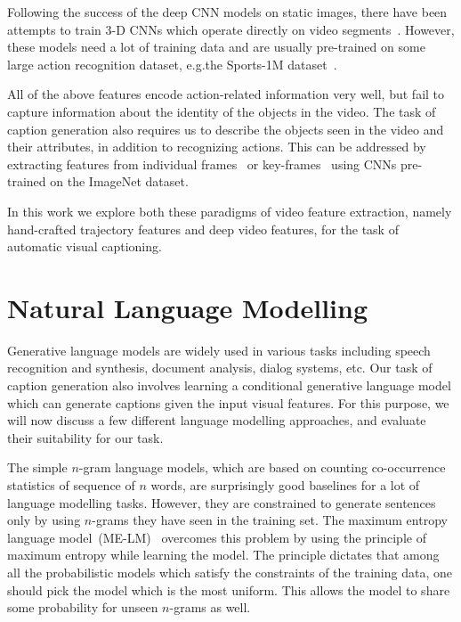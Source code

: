 Following the success of the deep CNN models on static images, there have been
attempts to train 3-D CNNs which operate directly on video
segments~\cite{3dCNN_ji2013, KarpathyCVPR14, DBLP:C3D}.
However, these models need a lot of training data and are usually pre-trained on
some large action recognition dataset, e.g.\@ the Sports-1M
dataset~\cite{KarpathyCVPR14}.

All of the above features encode action-related information very well, but fail to
capture information about the identity of the objects in the video.
The task of caption generation also requires us to describe the objects seen in
the video and their attributes, in addition to recognizing actions.
This can be addressed by extracting features from individual
frames~\cite{venugopalan2015sequence} or key-frames~\cite{shetty2015video} using
CNNs pre-trained on the ImageNet dataset.

In this work we explore both these paradigms of video feature extraction, namely
hand-crafted trajectory features and deep video features, for the task of
automatic visual captioning.

\section{Natural Language Modelling}
Generative language models are widely used in various tasks including speech
recognition and synthesis, document analysis, dialog systems, etc.
Our task of caption generation also involves learning a conditional generative
language model which can generate captions given the input visual features.
For this purpose, we will now discuss a few different language modelling
approaches, and evaluate their suitability for our task.

The simple $n$-gram language models, which are based on counting co-occurrence
statistics of sequence of $n$ words, are surprisingly good baselines for a lot
of language modelling tasks.
However, they are constrained to generate sentences only by using $n$-grams they
have seen in the training set.
The maximum entropy language model~(ME-LM)~\cite{berger1996maximum} overcomes this
problem by using the principle of maximum entropy while learning the model.
The principle dictates that among all the probabilistic models which satisfy the
constraints of the training data, one should pick the model which is the most
uniform.
This allows the model to share some probability for unseen $n$-grams as well.

